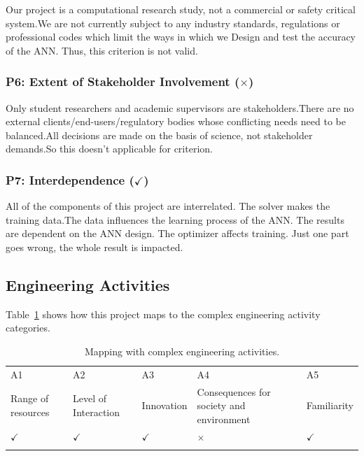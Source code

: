 Our project is a computational research study, not a commercial or safety critical system.We are not currently subject to any industry standards, regulations or professional codes which limit the ways in which we
Design and test the accuracy of the ANN. Thus, this criterion is not valid.


\subsubsection{P6: Extent of Stakeholder Involvement ($\times$)}

Only student researchers and academic supervisors are stakeholders.There are no external clients/end-users/regulatory bodies whose conflicting needs need to be
balanced.All decisions are made on the basis of science, not stakeholder demands.So this doesn't applicable for criterion.


\subsubsection{P7: Interdependence ($\checkmark$)}

All of the components of this project are interrelated. The solver makes the training data.The data influences the learning process of the ANN. The results are dependent on the ANN design. The optimizer affects training. Just one part goes wrong, the whole result is impacted.



\subsection{Engineering Activities}

Table~\ref{tab:e_act} shows how this project maps to the complex engineering activity categories.

\begin{center}
    \begin{table}[ht]
        \centering
        \caption{Mapping with complex engineering activities.}
        \begin{tabular}{|p{}|p{}|p{}|p{}|p{}|}
        \hline
        A1& A2& A3& A4& A5\\
        Range of resources & Level of Interaction & Innovation & Consequences for society and environment & Familiarity\\
        \hline 
        $\checkmark$ & $\checkmark$ & $\checkmark$ & $\times$ & $\checkmark$\\
        &&&&\\
        \hline 
        \end{tabular}
        \label{tab:e_act}
    \end{table}
\end{center}

